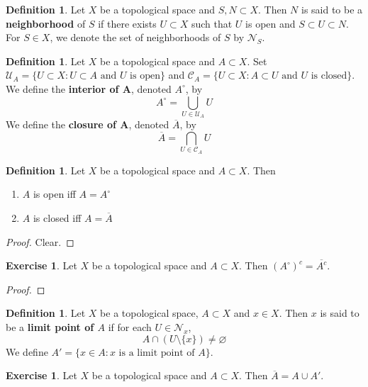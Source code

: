 \documentclass[12pt]{amsart}
\theoremstyle{definition}
\newtheorem{defn}[definition]{Definition}
\newtheorem{ex}[definition]{Exercise}
\newcommand{\MC}{\mathcal{C}}
\newcommand{\MN}{\mathcal{N}}
\newcommand{\MU}{\mathcal{U}}
\newcommand{\lex}[1]{\label{ex:#1}}
\newcommand{\ld}[1]{\label{defn:#1}}
\begin{document}
	\begin{defn} \ld{}
	Let $X$ be a topological space and $S,N \subset X$. Then $N$ is said to be a \textbf{neighborhood} of $S$ if there exists $U \subset X$ such that $U$ is open and $S \subset U \subset N$. For $S \in X$, we denote the set of neighborhoods of $S$ by $\MN_S$.
	\end{defn}
	
	\begin{defn} \ld{}
	Let $X$ be a topological space and $A \subset X$. Set $\MU_{A} = \{U \subset X:U \subset A \text{ and $U$ is open}\}$ and $\MC_{A} = \{U \subset X: A \subset U \text{ and $U$ is closed}\}$. \\
	We define the \textbf{interior of A}, denoted $A^{\circ}$, by $$A^{\circ} = \bigcup_{U \in \MU_{A}} U$$ 
	We define the \textbf{closure of A}, denoted $\overline{A}$, by $$\overline{A} = \bigcap_{U \in \MC_{A}} U$$ 
	\end{defn}
	
	\begin{defn} \ld{}
	Let $X$ be a topological space and $A \subset X$. Then 
	\begin{enumerate}
	\item $A$ is open iff $A = A^{\circ}$ 
	\item $A$ is closed iff $A = \overline{A}$
	\end{enumerate}
	\end{defn}
	
	\begin{proof}
	Clear.
	\end{proof}
	
	\begin{ex} \lex{}
	Let $X$ be a topological space and $A \subset X$. Then $(A^{\circ})^c = \overline{A^c}$.
	\end{ex}	
	
	\begin{proof}
	
	\end{proof}


	\begin{defn} \ld{}
	Let $X$ be a topological space, $A \subset X$ and $x \in X$. Then $x$ is said to be a \textbf{limit point of $A$} if for each $U \in \MN_x$, $$A \cap (U \setminus \{x\}) \neq \varnothing$$  
	We define $A' = \{x \in A: \text{$x$ is a limit point of $A$}\}$.
	\end{defn}
	
	\begin{ex} \lex{}
	Let $X$ be a topological space and $A \subset X$. Then $\overline{A} = A \cup A'$. 
	\end{ex}	
	
\end{document}
